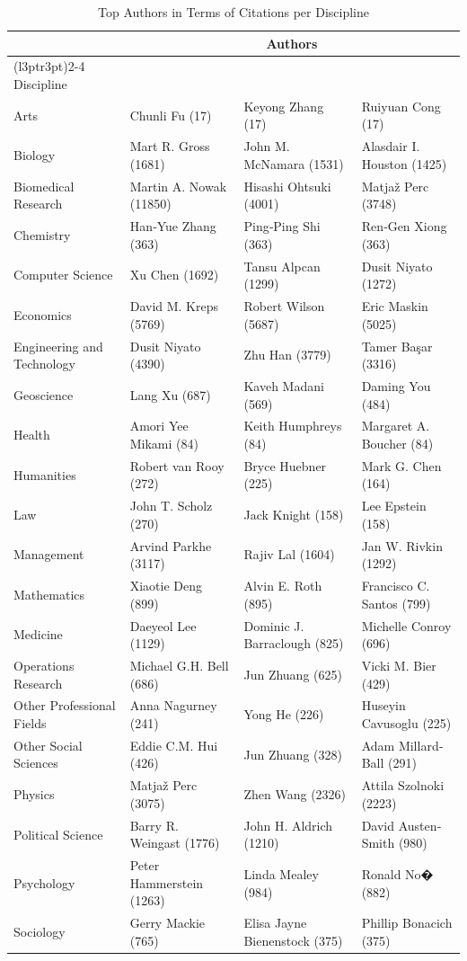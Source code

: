 \documentclass[
  12pt,
]{article}
\begin{document}
\begin{table}[H]

\caption{\label{tab:authors per discipline}Top Authors in Terms of Citations per Discipline}
\centering
\fontsize{8}{10}\selectfont
\begin{tabular}[t]{llll}
\toprule
\multicolumn{1}{c}{ } & \multicolumn{3}{c}{Authors} \\
\cmidrule(l{3pt}r{3pt}){2-4}
Discipline &  &  & \\
\midrule
Arts & Chunli Fu (17) & Keyong Zhang (17) & Ruiyuan Cong (17)\\
Biology & Mart R. Gross (1681) & John M. McNamara (1531) & Alasdair I. Houston (1425)\\
Biomedical Research & Martin A. Nowak (11850) & Hisashi Ohtsuki (4001) & Matjaž Perc (3748)\\
Chemistry & Han‐Yue Zhang (363) & Ping‐Ping Shi (363) & Ren‐Gen Xiong (363)\\
Computer Science & Xu Chen (1692) & Tansu Alpcan (1299) & Dusit Niyato (1272)\\
Economics & David M. Kreps (5769) & Robert Wilson (5687) & Eric Maskin (5025)\\
Engineering and Technology & Dusit Niyato (4390) & Zhu Han (3779) & Tamer Başar (3316)\\
Geoscience & Lang Xu (687) & Kaveh Madani (569) & Daming You (484)\\
Health & Amori Yee Mikami (84) & Keith Humphreys (84) & Margaret A. Boucher (84)\\
Humanities & Robert van Rooy (272) & Bryce Huebner (225) & Mark G. Chen (164)\\
Law & John T. Scholz (270) & Jack Knight (158) & Lee Epstein (158)\\
Management & Arvind Parkhe (3117) & Rajiv Lal (1604) & Jan W. Rivkin (1292)\\
Mathematics & Xiaotie Deng (899) & Alvin E. Roth (895) & Francisco C. Santos (799)\\
Medicine & Daeyeol Lee (1129) & Dominic J. Barraclough (825) & Michelle Conroy (696)\\
Operations Research & Michael G.H. Bell (686) & Jun Zhuang (625) & Vicki M. Bier (429)\\
Other Professional Fields & Anna Nagurney (241) & Yong He (226) & Huseyin Cavusoglu (225)\\
Other Social Sciences & Eddie C.M. Hui (426) & Jun Zhuang (328) & Adam Millard‐Ball (291)\\
Physics & Matjaž Perc (3075) & Zhen Wang (2326) & Attila Szolnoki (2223)\\
Political Science & Barry R. Weingast (1776) & John H. Aldrich (1210) & David Austen‐Smith (980)\\
Psychology & Peter Hammerstein (1263) & Linda Mealey (984) & Ronald No� (882)\\
Sociology & Gerry Mackie (765) & Elisa Jayne Bienenstock (375) & Phillip Bonacich (375)\\
\bottomrule
\end{tabular}
\end{table}
\end{document}
